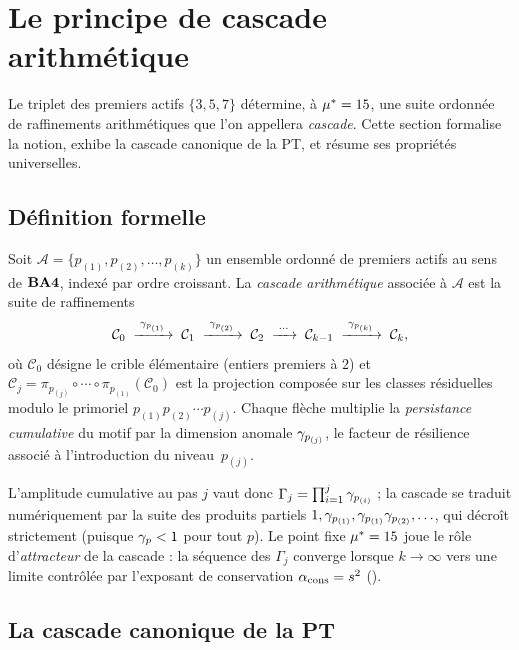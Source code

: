 \section{Le principe de cascade arithmétique}
\label{sec:cascade}

Le triplet des premiers actifs $\{3, 5, 7\}$ détermine, à $\mu^{*} = 15$, une suite ordonnée de raffinements arithmétiques que l'on appellera \emph{cascade}. Cette section formalise la notion, exhibe la cascade canonique de la PT, et résume ses propriétés universelles.

\subsection{Définition formelle}
\label{sec:cascade:def}

\begin{definition}
\label{def:cascade}
Soit $\mathcal A = \{p_{(1)}, p_{(2)}, \ldots, p_{(k)}\}$ un ensemble ordonné de premiers actifs au sens de $\textbf{BA4}$, indexé par ordre croissant. La \emph{cascade arithmétique} associée à $\mathcal A$ est la suite de raffinements
\[
\mathcal C_0 \;\xrightarrow{\;\gamma_{p_{(1)}}\;}\;
\mathcal C_1 \;\xrightarrow{\;\gamma_{p_{(2)}}\;}\;
\mathcal C_2 \;\xrightarrow{\;\cdots\;}\;
\mathcal C_{k-1} \;\xrightarrow{\;\gamma_{p_{(k)}}\;}\;
\mathcal C_k,
\]
où $\mathcal C_0$ désigne le crible élémentaire (entiers premiers à $2$) et $\mathcal C_j = \pi_{p_{(j)}} \circ \cdots \circ \pi_{p_{(1)}}(\mathcal C_0)$ est la projection composée sur les classes résiduelles modulo le primoriel $p_{(1)} p_{(2)} \cdots p_{(j)}$. Chaque flèche multiplie la \emph{persistance cumulative} du motif par la dimension anomale $\gamma_{p_{(j)}}$, le facteur de résilience associé à l'introduction du niveau~$p_{(j)}$.
\end{definition}

L'amplitude cumulative au pas $j$ vaut donc $\Gamma_j = \prod_{i=1}^{j} \gamma_{p_{(i)}}$ ; la cascade se traduit numériquement par la suite des produits partiels $1, \gamma_{p_{(1)}}, \gamma_{p_{(1)}}\gamma_{p_{(2)}}, \ldots$, qui décroît strictement (puisque $\gamma_{p} < 1$ pour tout $p$). Le point fixe $\mu^{*} = 15$ joue le rôle d'\emph{attracteur} de la cascade : la séquence des $\Gamma_j$ converge lorsque $k \to \infty$ vers une limite contrôlée par l'exposant de conservation $\alpha_{\rm cons} = s^2$ (\Ttwo).

\subsection{La cascade canonique de la PT}
\label{sec:cascade:canonique}

